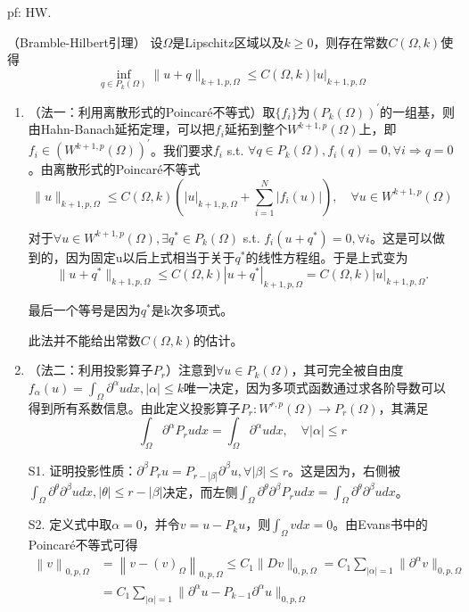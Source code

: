 pf: HW.

\begin{lem}（Bramble-Hilbert引理）
  设$\Omega$是Lipschitz区域以及$k \ge 0$，则存在常数$C(\Omega, k)$使得
  \[
    \inf_{q \in P_{k}(\Omega)}\|u+q\|_{k+1, p, \Omega} \le C(\Omega, k)|u|_{k+1, p, \Omega}
  \]
\end{lem}

\begin{pf}
  \quad
  \begin{enumerate}
    \item （法一：利用离散形式的Poincaré不等式）取$\{f_i\}$为$(P_k(\Omega))^{\prime}$的一组基，则由Hahn-Banach延拓定理，可以把$f_i$延拓到整个$W^{k + 1, p}(\Omega)$上，即$f_i \in (W^{k + 1, p}(\Omega))^{\prime}$。我们要求$f_i$ s.t. $\forall q \in P_k(\Omega), f_i(q) = 0, \forall i \Rightarrow q = 0$。由离散形式的Poincaré不等式
    \[
      \|u\|_{k+1, p, \Omega} \le C(\Omega, k)\left(|u|_{k+1, p, \Omega}+\sum_{i=1}^{N}\left|f_{i}(u)\right|\right), \quad \forall u \in W^{k+1, p}(\Omega)
    \]
    
    对于$\forall u \in W^{k+1, p}(\Omega), \exists q^{\ast} \in P_k(\Omega)$ s.t. $f_i(u + q^{\ast}) = 0, \forall i$。这是可以做到的，因为固定u以后上式相当于关于$q^{\ast}$的线性方程组。于是上式变为
    \[
      \|u + q^{\ast}\|_{k+1, p, \Omega} \le C(\Omega, k)|u + q^{\ast}|_{k+1, p, \Omega} = C(\Omega, k)|u|_{k+1, p, \Omega}.
    \]

    最后一个等号是因为$q^{\ast}$是k次多项式。

    此法并不能给出常数$C(\Omega, k)$的估计。

    \item （法二：利用投影算子$P_r$）注意到$\forall u \in P_k(\Omega)$，其可完全被自由度$f_\alpha(u) = \int_\Omega \partial^\alpha u dx, |\alpha| \le k$唯一决定，因为多项式函数通过求各阶导数可以得到所有系数信息。由此定义投影算子$P_r: W^{r, p}(\Omega) \to P_r(\Omega)$，其满足
    \[
      \int_{\Omega} \partial^{\alpha} P_{r} u dx=\int_{\Omega} \partial^{\alpha} u dx, \quad \forall |\alpha| \le r
    \]

    S1. 证明投影性质：$\partial^\beta P_r u = P_{r - |\beta|} \partial^\beta u, \forall |\beta| \le r$。这是因为，右侧被$\int_{\Omega} \partial^{\theta} \partial^{\beta} u dx ,  |\theta| \le r-|\beta|$决定，而左侧$\int_{\Omega} \partial^{\theta} \partial^{\beta} P_{r} u dx=\int_{\Omega} \partial^{\theta} \partial^{\beta} u dx$。

    S2. 定义式中取$\alpha = 0$，并令$v = u - P_k u$，则$\int_\Omega v dx = 0$。由Evans书中的Poincaré不等式可得
    \[
      \begin{aligned}
        \left\|v\right\|_{0, p, \Omega} &= \left\|v-(v)_{\Omega}\right\|_{0, p, \Omega} \le C_1\|D v\|_{0, p, \Omega} = C_1\sum_{|\alpha| = 1} \|\partial^\alpha v\|_{0, p, \Omega}\\
        &= C_1\sum_{|\alpha| = 1} \|\partial^\alpha u - P_{k - 1}\partial^\alpha u\|_{0, p, \Omega}
      \end{aligned}
    \]


\end{enumerate}
\end{pf}
